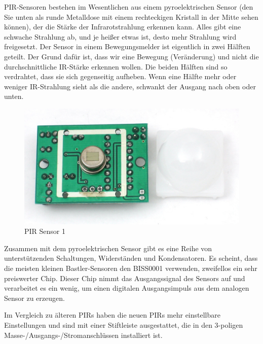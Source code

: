 \documentclass[conference]{IEEEtran}
\begin{document}
PIR-Sensoren bestehen im Wesentlichen aus einem pyroelektrischen Sensor (den Sie unten als runde Metalldose mit einem rechteckigen Kristall in der Mitte sehen können), der die Stärke der Infrarotstrahlung erkennen kann. Alles gibt eine schwache Strahlung ab, und je heißer etwas ist, desto mehr Strahlung wird freigesetzt. Der Sensor in einem Bewegungsmelder ist eigentlich in zwei Hälften geteilt. Der Grund dafür ist, dass wir eine Bewegung (Veränderung) und nicht die durchschnittliche IR-Stärke erkennen wollen. Die beiden Hälften sind so verdrahtet, dass sie sich gegenseitig aufheben. Wenn eine Hälfte mehr oder weniger IR-Strahlung sieht als die andere, schwankt der Ausgang nach oben oder unten.

\begin{figure}
	\begin{center}
		\includegraphics[scale=0.15]{pi2}
	\end{center}
	\caption{PIR Sensor 1}
\end{figure}

Zusammen mit dem pyroelektrischen Sensor gibt es eine Reihe von unterstützenden Schaltungen, Widerständen und Kondensatoren. Es scheint, dass die meisten kleinen Bastler-Sensoren den BISS0001 verwenden, zweifellos ein sehr preiswerter Chip. Dieser Chip nimmt das Ausgangssignal des Sensors auf und verarbeitet es ein wenig, um einen digitalen Ausgangsimpuls aus dem analogen Sensor zu erzeugen.

Im Vergleich zu älteren PIRs haben die neuen PIRs mehr einstellbare Einstellungen und sind mit einer Stiftleiste ausgestattet, die in den 3-poligen Masse-/Ausgangs-/Stromanschlüssen installiert ist.
\end{document}
